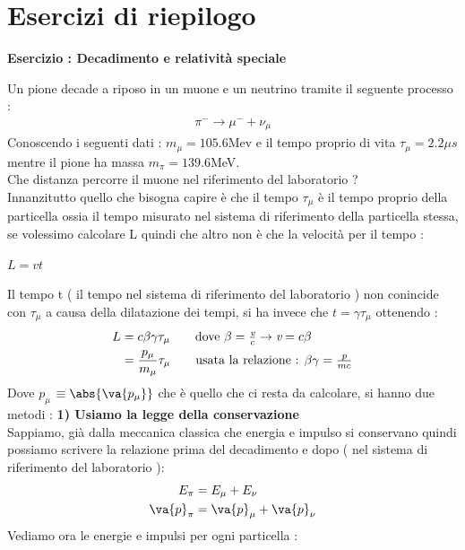 \documentclass[a4paper, 12pt, twoside]{report}
\begin{document}
\section{Esercizi di riepilogo}
\begin{center}{\textbf{Esercizio : Decadimento e relatività speciale}}\end{center}
Un pione decade a riposo in un muone e un neutrino tramite il seguente processo : 
\begin{align*}
    \pi^{-} \rightarrow \mu^{-} + \nu_{\mu}
\end{align*}
Conoscendo i seguenti dati : $m_{\mu} = 105.6$Mev e il tempo proprio di vita $\tau_{\mu} = 2.2\mu s$ mentre il 
pione ha massa $m_{\pi} = 139.6$MeV.\\ 
Che distanza percorre il muone nel riferimento del laboratorio ? \\
Innanzitutto quello che bisogna capire è che il tempo $\tau_{\mu}$ è il tempo proprio della particella ossia il tempo 
misurato nel sistema di riferimento della particella stessa, se volessimo calcolare L quindi che altro non è che la 
velocità per il tempo :\\
\begin{center} $L = \textit{v}t$\end{center}
Il tempo t ( il tempo nel sistema di riferimento del laboratorio ) non conincide con $\tau_{\mu}$ a causa della dilatazione dei tempi, 
si ha invece che $t=\gamma\tau_{\mu}$ ottenendo : 
\begin{align*}
        L &= c\beta\gamma\tau_{\mu}  \tag*{dove $\beta = \frac{\textit{v}}{c} \rightarrow \textit{v} = c\beta$} \\
          &= \frac{\textit{$p_{\mu}$}}{m_{\mu}}\tau_{\mu} \tag*{usata la relazione : $\beta\gamma = \frac{\textit{p}}{mc}$}
\end{align*}
Dove \textit{$p_{\mu}$} $\equiv \abs{\va{p_{\mu}}}$ che è quello che ci resta da calcolare, si hanno due metodi : 
\newpage
\textbf{1) Usiamo la legge della conservazione} \\
Sappiamo, già dalla meccanica classica che energia e impulso si conservano quindi possiamo scrivere la relazione prima del decadimento
e dopo ( nel sistema di riferimento del laboratorio ): 
\begin{align*}
        E_{\pi} &= E_{\mu} + E_{\nu} \\
        \va{p}_{\pi} &= \va{p}_{\mu} + \va{p}_{\nu}
\end{align*}
Vediamo ora le energie e impulsi per ogni particella : \\
\end{document}
